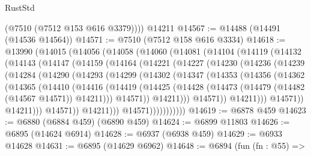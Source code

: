 \begin{lexlean}{RustStd}
\begin{coremodule}
        (@7510 (@7512 @153 @616 @3379))))
    @14211
@14567 := @14488 (@14491 (@14536 @14564))
@14571 := @7510 (@7512 @158 @616 @3334)
@14618 := @13990
    (@14015
      (@14056
        (@14058
          (@14060
            (@14081
              (@14104
                (@14119
                  (@14132
                    (@14143
                      (@14147
                        (@14159
                          (@14164
                            (@14221
                              (@14227
                                (@14230
                                  (@14236
                                    (@14239
                                      (@14284
                                        (@14290
                                          (@14293
                                            (@14299
                                              (@14302
                                                (@14347
                                                  (@14353
                                                    (@14356
                                                      (@14362
                                                        (@14365
                                                          (@14410
                                                            (@14416
                                                              (@14419
                                                                (@14425
                                                                  (@14428
                                                                    (@14473
                                                                      (@14479
                                                                        (@14482 (@14567 @14571))
                                                                        @14211)))
                                                                  @14571))
                                                              @14211)))
                                                        @14571))
                                                    @14211)))
                                              @14571))
                                          @14211)))
                                    @14571))
                                @14211)))
                          @14571)))))))))))
@14619 := @6878 @459
@14623 := @6880 (@6884 @459) (@6890 @459)
@14624 := @6899 @11803
@14626 := @6895 (@14624 @6914)
@14628 := @6937 (@6938 @459)
@14629 := @6933 @14628
@14631 := @6895 (@14629 @6962)
@14648 := @6894
    (fun (fn : @55) =>

\end{coremodule}
\end{lexlean}
